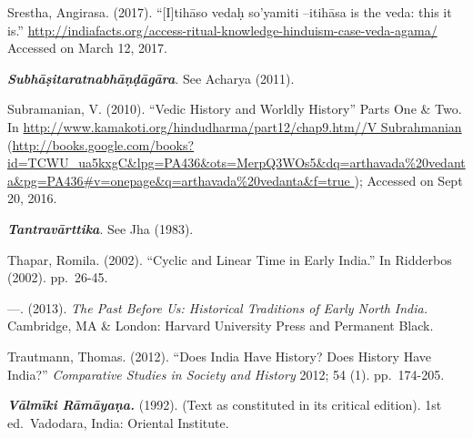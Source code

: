\begin{thebibliography}{99}
  Srestha, Angirasa. (2017). “[I]tihāso vedaḥ so’yamiti –itihāsa is the veda: this it is.” \url{http://indiafacts.org/access-ritual-knowledge-hinduism-case-veda-agama/} Accessed on March 12, 2017.

  \textbf{\textit{Subhāṣitaratnabhāṇḍāgāra}}. See Acharya (2011).

  Subramanian, V. (2010). “Vedic History and Worldly History” Parts One \& Two. In \url{http://www.kamakoti.org/hindudharma/part12/chap9.htm//V Subrahmanian} (\url{http://books.google.com/books?id=TCWU_ua5kxgC&lpg=PA436&ots=MerpQ3WOs5&dq=arthavada%
}); Accessed on Sept 20, 2016.

  \textbf{\textit{Tantravārttika}}. See Jha (1983).

  Thapar, Romila. (2002). “Cyclic and Linear Time in Early India.” In Ridderbos (2002). pp.~26-45.

  —. (2013). \textit{The Past Before Us: Historical Traditions of Early North India.} Cambridge, MA \& London: Harvard University Press and Permanent Black.

  Trautmann, Thomas. (2012). “Does India Have History? Does History Have India?” \textit{Comparative Studies in Society and History} 2012; 54 (1). pp.~174-205.

  \textbf{\textit{Vālmīki Rāmāyaṇa.}} (1992). (Text as constituted in its critical edition). 1st ed.\ Vadodara, India: Oriental Institute.

 \end{thebibliography}

\theendnotes

